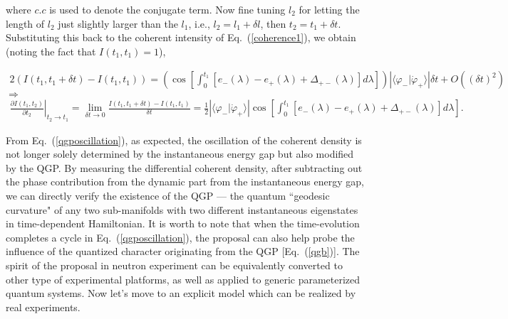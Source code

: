 \documentclass[aps,pra,twocolumn,
groupedaddress,10pt]{revtex4}
\def\bea{\begin{eqnarray}} \def\eea{\end{eqnarray}}
\begin{document}
where $c.c$ is used to denote the conjugate term.
Now fine tuning $l_2$ for letting the length of $l_2$ just slightly
larger than the $l_1$, i.e., $l_2 = l_1 + \delta l$, then $t_2 = t_1 + \delta t$.
Substituting this back to the coherent intensity of Eq.~(\ref{coherence1}),
we obtain (noting the fact that $I(t_1,t_1)=1$),
\begin{widetext}
\bea
2(I(t_1 ,t_1  + \delta t) - I(t_1 ,t_1 ))  = \left( {\cos \left[ {\int_0^{t_1 } {\left[ {e_ -  (\lambda ) - e_ +  (\lambda ) + \Delta _{+-} (\lambda )} \right]d\lambda } } \right]} \right) \left| {\langle\varphi_-|\dot{\varphi}_+\rangle } \right| \delta t + O\left( {(\delta t)^2 } \right)
 \eea
$\Rightarrow$
\bea
\left. {\frac{{\partial I(t_1 ,t_2 )}}{{\partial t_2 }}} \right|_{t_2  \to t_1 }
 = \mathop {\lim }\limits_{\delta t \to 0} \frac{{I(t_1 ,t_1  + \delta t) - I(t_1 ,t_1 )}}{{\delta t}}
 =\frac{1}{2} \left| {\langle\varphi_-|\dot{\varphi}_+\rangle } \right| \cos \left[ {\int_0^{t_1 } {\left[ {e_ -  (\lambda ) - e_ +  (\lambda ) + \Delta _{+-} (\lambda )} \right]d\lambda } } \right]. \label{qgposcillation}
\eea
 \end{widetext}
From Eq.~(\ref{qgposcillation}),
as expected, the oscillation
of the coherent density is not longer solely determined by the
instantaneous energy gap but also modified by the QGP.
By measuring the differential coherent density, after subtracting out the phase
contribution from the dynamic part from the instantaneous energy gap,
we can directly verify the existence of the QGP ---
the quantum ``geodesic curvature" of any two sub-manifolds with two different instantaneous eigenstates
in time-dependent Hamiltonian. It is worth to note that
when the time-evolution completes a cycle in Eq.~(\ref{qgposcillation}),
the proposal can also help probe the influence of the
quantized character originating from the QGP [Eq.~(\ref{qgb})].
The spirit of the proposal in neutron experiment
can be equivalently converted to other type of experimental platforms, as well as
applied to generic parameterized quantum systems.
Now let's move to an explicit model which can be realized by real experiments.
\end{document}
